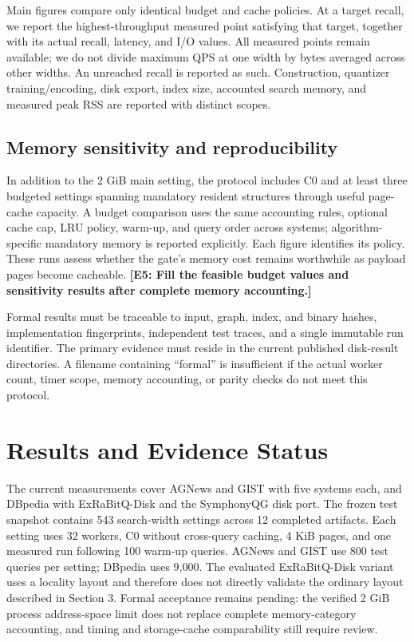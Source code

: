 Main figures compare only identical budget and cache policies. At a target recall, we report the highest-throughput measured point satisfying that target, together with its actual recall, latency, and I/O values. All measured points remain available; we do not divide maximum QPS at one width by bytes averaged across other widths. An unreached recall is reported as such. Construction, quantizer training/encoding, disk export, index size, accounted search memory, and measured peak RSS are reported with distinct scopes.

\subsection{Memory sensitivity and reproducibility}

In addition to the 2 GiB main setting, the protocol includes C0 and at least three budgeted settings spanning mandatory resident structures through useful page-cache capacity. A budget comparison uses the same accounting rules, optional cache cap, LRU policy, warm-up, and query order across systems; algorithm-specific mandatory memory is reported explicitly. Each figure identifies its policy. These runs assess whether the gate's memory cost remains worthwhile as payload pages become cacheable. \textbf{[E5: Fill the feasible budget values and sensitivity results after complete memory accounting.]}

Formal results must be traceable to input, graph, index, and binary hashes, implementation fingerprints, independent test traces, and a single immutable run identifier. The primary evidence must reside in the current published disk-result directories. A filename containing ``formal'' is insufficient if the actual worker count, timer scope, memory accounting, or parity checks do not meet this protocol.

\section{Results and Evidence Status}

The current measurements cover AGNews and GIST with five systems each, and DBpedia with ExRaBitQ-Disk and the SymphonyQG disk port. The frozen test snapshot contains 543 search-width settings across 12 completed artifacts. Each setting uses 32 workers, C0 without cross-query caching, 4 KiB pages, and one measured run following 100 warm-up queries. AGNews and GIST use 800 test queries per setting; DBpedia uses 9,000. The evaluated ExRaBitQ-Disk variant uses a locality layout and therefore does not directly validate the ordinary layout described in Section 3. Formal acceptance remains pending: the verified 2 GiB process address-space limit does not replace complete memory-category accounting, and timing and storage-cache comparability still require review.

